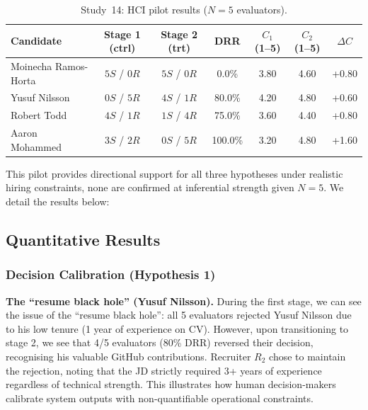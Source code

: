 \begin{table}[htbp]
    \centering
    \caption[Study~14: HCI pilot results]{Study~14: HCI pilot results ($N = 5$ evaluators).}
    \label{tab:hci-trial-results}
    \vspace{1.5ex}
    \small
    \setlength{\tabcolsep}{5pt}
    \begin{tabular}{l c c c c c c}
        \toprule
        \textbf{Candidate}   & \textbf{Stage 1 (ctrl)} & \textbf{Stage 2 (trt)} & \textbf{DRR} & \textbf{$C_1$ (1--5)} & \textbf{$C_2$ (1--5)} & \textbf{$\Delta C$} \\ \midrule
        Moinecha Ramos-Horta & $5S$ / $0R$            & $5S$ / $0R$            & 0.0\%        & 3.80                    & 4.60                    & +0.80                 \\
        Yusuf Nilsson        & $0S$ / $5R$            & $4S$ / $1R$            & 80.0\%       & 4.20                    & 4.80                    & +0.60                 \\
        Robert Todd          & $4S$ / $1R$            & $1S$ / $4R$            & 75.0\%       & 3.60                    & 4.40                    & +0.80                 \\
        Aaron Mohammed       & $3S$ / $2R$            & $0S$ / $5R$            & 100.0\%      & 3.20                    & 4.80                    & +1.60                 \\ \bottomrule
    \end{tabular}
\end{table}

This pilot provides directional support for all three hypotheses under realistic hiring constraints, 
none are confirmed at inferential strength given $N=5$. We detail the results below:

\subsection*{Quantitative Results}

\subsubsection{Decision Calibration (Hypothesis 1)}
\textbf{The ``resume black hole'' (Yusuf Nilsson).} During the first stage, we can see the issue of the ``resume black hole'': all 5 evaluators rejected Yusuf Nilsson
due to his low tenure (1 year of experience on CV). However, upon transitioning to stage 2, we see that 4/5 evaluators
(80\% DRR) reversed their decision, recognising his valuable GitHub contributions. Recruiter $R_2$ chose to
maintain the rejection, noting that the JD strictly required 3+ years of experience regardless
of technical strength. This illustrates how human decision-makers calibrate system outputs with non-quantifiable
operational constraints.

